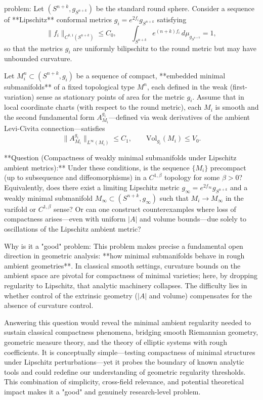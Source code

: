 problem:  
Let \( (S^{n+k}, g_{S^{n+k}}) \) be the standard round sphere.  
Consider a sequence of **Lipschitz** conformal metrics \( g_i = e^{2f_i} g_{S^{n+k}} \) satisfying  
\[
\|f_i\|_{C^{0,1}(S^{n+k})} \le C_0,\qquad 
\int_{S^{n+k}} e^{(n+k)f_i}\, d\mu_{g_{S^{n+k}}}=1,
\]
so that the metrics \(g_i\) are uniformly bilipschitz to the round metric but may have unbounded curvature.

Let \(M_i^n\subset (S^{n+k},g_i)\) be a sequence of compact, **embedded minimal submanifolds** of a fixed topological type \(M^n\), each defined in the weak (first-variation) sense as stationary points of area for the metric \(g_i\).  
Assume that in local coordinate charts (with respect to the round metric), each \(M_i\) is smooth and the second fundamental form \(A_{M_i}^{g_i}\)—defined via weak derivatives of the ambient Levi-Civita connection—satisfies
\[
\|A_{M_i}^{g_i}\|_{L^\infty(M_i)}\le C_1, \qquad 
\mathrm{Vol}_{g_i}(M_i)\le V_0.
\]

**Question (Compactness of weakly minimal submanifolds under Lipschitz ambient metrics):**  
Under these conditions, is the sequence \(\{M_i\}\) precompact (up to subsequence and diffeomorphisms) in a \(C^{1,\beta}\) topology for some \(\beta>0\)?  
Equivalently, does there exist a limiting Lipschitz metric \(g_\infty = e^{2f_\infty} g_{S^{n+k}}\) and a weakly minimal submanifold \(M_\infty \subset (S^{n+k}, g_\infty)\) such that \(M_i \to M_\infty\) in the varifold or \(C^{1,\beta}\) sense?  
Or can one construct counterexamples where loss of compactness arises—even with uniform \(|A|\) and volume bounds—due solely to oscillations of the Lipschitz ambient metric?

Why is it a "good" problem:  
This problem makes precise a fundamental open direction in geometric analysis: **how minimal submanifolds behave in rough ambient geometries**. In classical smooth settings, curvature bounds on the ambient space are pivotal for compactness of minimal varieties; here, by dropping regularity to Lipschitz, that analytic machinery collapses. The difficulty lies in whether control of the extrinsic geometry (\(|A|\) and volume) compensates for the absence of curvature control.  

Answering this question would reveal the minimal ambient regularity needed to sustain classical compactness phenomena, bridging smooth Riemannian geometry, geometric measure theory, and the theory of elliptic systems with rough coefficients. It is conceptually simple—testing compactness of minimal structures under Lipschitz perturbations—yet it probes the boundary of known analytic tools and could redefine our understanding of geometric regularity thresholds. This combination of simplicity, cross-field relevance, and potential theoretical impact makes it a "good" and genuinely research-level problem.